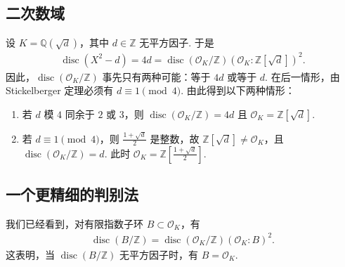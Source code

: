 \subsection{二次数域}\label{sec:nt-2-5-4}
设 $K=\mathbb Q(\sqrt d)$，其中 $d\in\mathbb Z$ 无平方因子. 于是
\begin{align*}
\operatorname{disc}(X^2-d)=4d
=\operatorname{disc}(\mathcal O_K/\mathbb Z)
(\mathcal O_K:\mathbb Z[\sqrt d])^2.
\end{align*}
因此，$\operatorname{disc}(\mathcal O_K/\mathbb Z)$ 事先只有两种可能：等于 $4d$ 或等于 $d$.
在后一情形，由 Stickelberger 定理必须有 $d\equiv1\pmod4$.
由此得到以下两种情形：
\begin{enumerate}[label=\roman*)]
\item 若 $d$ 模 $4$ 同余于 $2$ 或 $3$，则
$\operatorname{disc}(\mathcal O_K/\mathbb Z)=4d$ 且 $\mathcal O_K=\mathbb Z[\sqrt d]$.
\item 若 $d\equiv1\pmod4$，则 $\frac{1+\sqrt d}{2}$ 是整数，故 $\mathbb Z[\sqrt d]\ne\mathcal O_K$，且
$\operatorname{disc}(\mathcal O_K/\mathbb Z)=d$.
此时 $\mathcal O_K=\mathbb Z[\frac{1+\sqrt d}{2}]$.
\end{enumerate}

\subsection{一个更精细的判别法}\label{sec:nt-2-5-5}
我们已经看到，对有限指数子环 $B\subset\mathcal O_K$，有
\begin{align*}
\operatorname{disc}(B/\mathbb Z)=
\operatorname{disc}(\mathcal O_K/\mathbb Z)(\mathcal O_K:B)^2.
\end{align*}
这表明，当 $\operatorname{disc}(B/\mathbb Z)$ 无平方因子时，有 $B=\mathcal O_K$.

